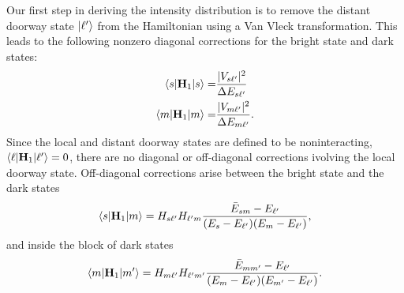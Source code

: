 \documentclass[12pt]{mitthesis}
\begin{document}
Our first step in deriving the intensity distribution is to remove the
distant doorway state $\mathinner{|{\ell'}\rangle}$ from the Hamiltonian using a Van Vleck
transformation.  This leads to the following nonzero diagonal
corrections for the bright state and dark states:
\begin{align}
  \mathinner{\langle{s|\mathbf{H}_1|s}\rangle} =&
    \frac{\lvert V_{s\ell'} \rvert^2}{\Delta E_{s\ell'}}\\
  \mathinner{\langle{m|\mathbf{H}_1|m}\rangle} =&
    \frac{\lvert V_{m\ell'} \rvert^2}{\Delta E_{m\ell'}}.
\end{align}
Since the local and distant doorway states are defined to be
noninteracting, $\mathinner{\langle{\ell|\mathbf{H}_1|\ell'}\rangle} = 0$, there are no
diagonal or off-diagonal corrections ivolving the local doorway
state.  Off-diagonal corrections arise between the bright state and
the dark states
\begin{equation}
  \mathinner{\langle{s|\mathbf{H}_1|m}\rangle} = H_{s\ell'} H_{\ell' m}
    \frac{\bar{E}_{sm} - E_{\ell'}}{(E_s - E_{\ell'})(E_m - E_{\ell'})},
\end{equation}
and inside the block of dark states
\begin{equation}
  \mathinner{\langle{m|\mathbf{H}_1|m'}\rangle} = H_{m \ell'} H_{\ell' m'}
    \frac{\bar{E}_{mm'} - E_{\ell'}}{(E_m - E_{\ell'})(E_{m'} - E_{\ell'})}.
\end{equation}
\end{document}
